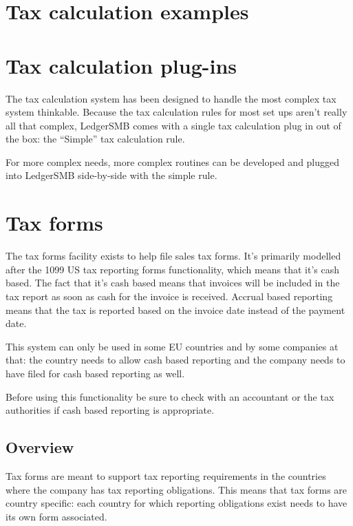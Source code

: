 \section{Tax calculation examples}


\section{Tax calculation plug-ins}
\label{sec-tax-rule-plugins}

The tax calculation system has been designed to handle the most complex tax system
thinkable. Because the tax calculation rules for most set ups aren't really all that
complex, LedgerSMB comes with a single tax calculation plug in out of the box: the
``Simple'' tax calculation rule.

For more complex needs, more complex routines can be developed and plugged into
LedgerSMB side-by-side with the simple rule.


\section{Tax forms}

The tax forms facility exists to help file sales tax forms. It's primarily modelled
after the 1099 US tax reporting forms functionality, which means that it's cash based.
The fact that it's cash based means that invoices will be included in the tax report
as soon as cash for the invoice is received. Accrual based reporting means that the
tax is reported based on the invoice date instead of the payment date.

This system can only be used in some EU countries and by some companies at that: the
country needs to allow cash based reporting and the company needs to have filed
for cash based reporting as well.

Before using this functionality be sure to check with an accountant or the tax
authorities if cash based reporting is appropriate.

\subsection{Overview}
Tax forms are meant to support tax reporting requirements in the countries
where the company has tax reporting obligations. This means that tax forms
are country specific: each country for which reporting obligations exist
needs to have its own form associated.

